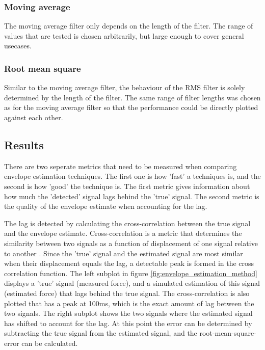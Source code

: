 \subsubsection{Moving average}
The moving average filter only depends on the length of the filter. The range of values that are tested is chosen arbitrarily, but large enough to cover general usecases.

\subsubsection{Root mean square}
Similar to the moving average filter, the behaviour of the RMS filter is solely determined by the length of the filter. The same range of filter lengths was chosen as for the moving average filter so that the performance could be directly plotted against each other.

\subsection{Results}
There are two seperate metrics that need to be measured when comparing envelope estimation techniques. The first one is how 'fast' a techniques is, and the second is how 'good' the technique is. The first metric gives information about how much the 'detected' signal lags behind the 'true' signal. The second metric is the quality of the envelope estimate when accounting for the lag. 

The lag is detected by calculating the cross-correlation between the true signal and the envelope estimate. Cross-correlation is a metric that determines the similarity between two signals as a function of displacement of one signal relative to another \cite{wiki:cross_correlation}. Since the 'true' signal and the estimated signal are most similar when their displacement equals the lag, a detectable peak is formed in the cross correlation function. The left subplot in figure \ref{fig:envelope_estimation_method} displays a 'true' signal (measured force), and a simulated estimation of this signal (estimated force) that lags behind the true signal. The cross-correlation is also plotted that has a peak at 100ms, which is the exact amount of lag between the two signals. The right subplot shows the two signals where the estimated signal has shifted to account for the lag. At this point the error can be determined by subtracting the true signal from the estimated signal, and the root-mean-square-error can be calculated. 

